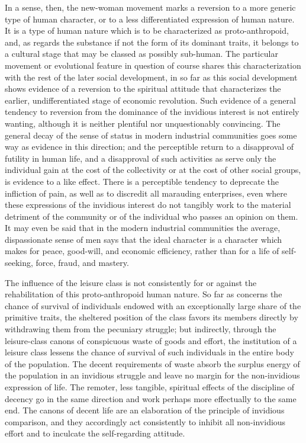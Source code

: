 \documentclass[12pt]{report}
\begin{document}
In a sense, then, the new-woman movement marks a reversion to a more
generic type of human character, or to a less differentiated
expression of human nature. It is a type of human nature which is to be
characterized as proto-anthropoid, and, as regards the substance if not
the form of its dominant traits, it belongs to a cultural stage that may
be classed as possibly sub-human. The particular movement or evolutional
feature in question of course shares this characterization with the rest
of the later social development, in so far as this social development
shows evidence of a reversion to the spiritual attitude that
characterizes the earlier, undifferentiated stage of economic
revolution. Such evidence of a general tendency to reversion from the
dominance of the invidious interest is not entirely wanting, although it
is neither plentiful nor unquestionably convincing. The general decay
of the sense of status in modern industrial communities goes some way as
evidence in this direction; and the perceptible return to a disapproval
of futility in human life, and a disapproval of such activities as serve
only the individual gain at the cost of the collectivity or at the
cost of other social groups, is evidence to a like effect. There is a
perceptible tendency to deprecate the infliction of pain, as well as to
discredit all marauding enterprises, even where these expressions of the
invidious interest do not tangibly work to the material detriment of
the community or of the individual who passes an opinion on them. It
may even be said that in the modern industrial communities the average,
dispassionate sense of men says that the ideal character is a character
which makes for peace, good-will, and economic efficiency, rather than
for a life of self-seeking, force, fraud, and mastery.

The influence of the leisure class is not consistently for or against
the rehabilitation of this proto-anthropoid human nature. So far
as concerns the chance of survival of individuals endowed with an
exceptionally large share of the primitive traits, the sheltered
position of the class favors its members directly by withdrawing them
from the pecuniary struggle; but indirectly, through the leisure-class
canons of conspicuous waste of goods and effort, the institution of a
leisure class lessens the chance of survival of such individuals in the
entire body of the population. The decent requirements of waste absorb
the surplus energy of the population in an invidious struggle and leave
no margin for the non-invidious expression of life. The remoter, less
tangible, spiritual effects of the discipline of decency go in the same
direction and work perhaps more effectually to the same end. The
canons of decent life are an elaboration of the principle of invidious
comparison, and they accordingly act consistently to inhibit all
non-invidious effort and to inculcate the self-regarding attitude.
\end{document}
